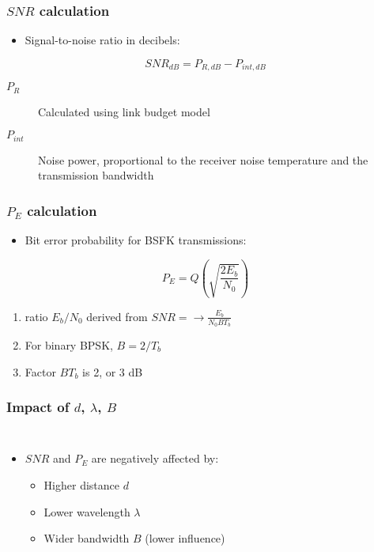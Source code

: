 \documentclass{beamer}
\begin{document}
\begin{frame}
	\frametitle{$SNR$ calculation}
	\begin{itemize}
		\item Signal-to-noise ratio in decibels:
	\end{itemize}
	\begin{equation}
		{SNR}_{dB} = P_{R, dB} - P_{int, dB}
	\end{equation}
	\begin{description}
		\item[$P_R$] Calculated using link budget model
		\item[$P_{int}$] Noise power, proportional to the receiver noise temperature and the transmission bandwidth
	\end{description}
\end{frame}

\begin{frame}
	\frametitle{$P_E$ calculation}
	\begin{itemize}
		\item Bit error probability for BSFK transmissions:
	\end{itemize}
	\begin{equation}
		P_E = Q\left(\sqrt{\frac{2E_b}{N_0}}\right)
	\end{equation}
	\begin{enumerate}
		\item ratio $E_b / N_0$ derived from $SNR = \rightarrow \frac{E_b}{N_0 B T_b}$
		\item For binary BPSK, $B = 2/T_b$
		\item Factor $B T_b$ is 2, or 3 dB
	\end{enumerate}
\end{frame}

\begin{frame}
	\frametitle{Impact of $d$, $\lambda$, $B$}
	\begin{columns}
			\begin{itemize}
				\item $SNR$ and $P_E$ are negatively affected by:
				\begin{itemize}
					\item Higher distance $d$
					\item Lower wavelength $\lambda$
					\item Wider bandwidth $B$ (lower influence)
				\end{itemize}
			\end{itemize}
	\end{columns}
\end{frame}
\end{document}

